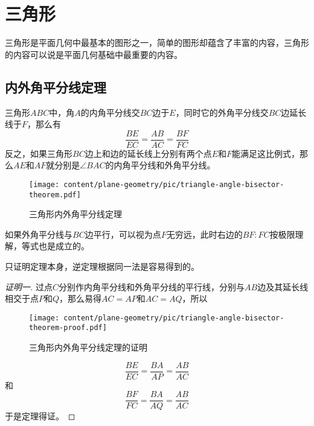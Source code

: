 
\section{三角形}
\label{sec:triangle-base-discussion}

三角形是平面几何中最基本的图形之一，简单的图形却蕴含了丰富的内容，三角形的内容可以说是平面几何基础中最重要的内容。

\subsection{内外角平分线定理}
\label{sec:triangle-angle-bisector-theorem}

\begin{theorem}[三角形内外角平分线定理]
  三角形$ABC$中，角$A$的内角平分线交$BC$边于$E$，同时它的外角平分线交$BC$边延长线于$F$，那么有
  \begin{equation}
    \label{eq:triangle-angle-bisector-theorem}
    \frac{BE}{EC} = \frac{AB}{AC} = \frac{BF}{FC}
  \end{equation}
  反之，如果三角形$BC$边上和边的延长线上分别有两个点$E$和$F$能满足这比例式，那么$AE$和$AF$就分别是$\angle BAC$的内角平分线和外角平分线。
\end{theorem}

\begin{figure}[htbp]
\centering
\texttt{[image: content/plane-geometry/pic/triangle-angle-bisector-theorem.pdf]}
\caption{三角形内外角平分线定理}
\label{fig:triangle-angle-bisector-theorem}
\end{figure}

如果外角平分线与$BC$边平行，可以视为点$F$无穷远，此时右边的$BF : FC$按极限理解，等式也是成立的。

只证明定理本身，逆定理根据同一法是容易得到的。

\begin{proof}[证明一]
  过点$C$分别作内角平分线和外角平分线的平行线，分别与$AB$边及其延长线相交于点$P$和$Q$，那么易得$AC=AP$和$AC=AQ$，所以

\begin{figure}[htbp]
\centering
\texttt{[image: content/plane-geometry/pic/triangle-angle-bisector-theorem-proof.pdf]}
\caption{三角形内外角平分线定理的证明}
\label{fig:triangle-angle-bisector-theorem-proof}
\end{figure}

  \begin{equation*}
    \frac{BE}{EC} = \frac{BA}{AP} = \frac{AB}{AC}
  \end{equation*}
  和
  \begin{equation*}
    \frac{BF}{FC} = \frac{BA}{AQ} = \frac{AB}{AC}
  \end{equation*}
于是定理得证。
\end{proof}

